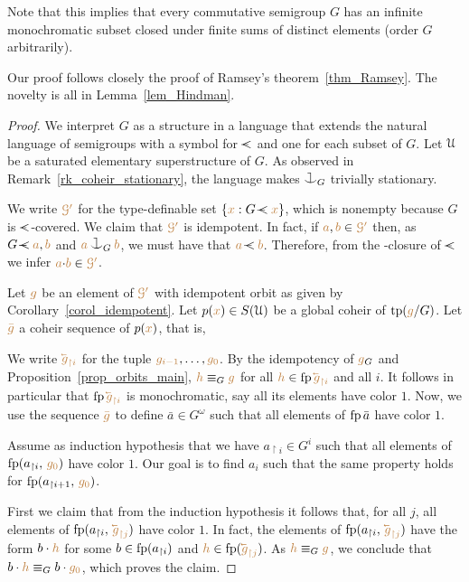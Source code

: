 Note that this implies that every commutative semigroup $G$ has an infinite monochromatic subset 
closed under finite sums of distinct elements (order $G$ arbitrarily).

Our proof follows closely the proof of Ramsey's theorem~\ref{thm_Ramsey}.
%
The novelty is all in Lemma~\ref{lem_Hindman}.

\begin{proof}
We interpret $G$ as a structure in a language 
that extends the natural language of semigroups
with a symbol for $\cpaw$ and one for each subset of $G$.
%
Let $\EuScript U$ be a saturated elementary superstructure of $G$.
%
As observed in Remark~\ref{rk_coheir_stationary}, 
the language makes $\cnonfork_G$ trivially stationary.

We write ${\color{brown}\EuScript G'}$ for the type-definable set $\{{\mr x} : G\cpaw{\mr x}\}$,
which is nonempty because $G$ is $\cpaw$-covered.
%
We claim that ${\color{brown}\EuScript G'}$ is idempotent.
%
In fact, if ${\color{brown} a},{\color{brown} b}\in{\color{brown}\EuScript G'}$ 
then, as $G\cpaw{\mr a},{\mr b}$ and ${\mr a}\cnonfork_G{\mr b}$, 
we must have that ${\mr a}\cpaw{\mr b}$.
%
Therefore, from the \cpawdot-closure of $\cpaw$ we infer ${\color{brown} a}{\cdot}{\color{brown} b}\in{\color{brown}\EuScript G'}$.

Let ${\color{brown} g}$ be an element of ${\color{brown}\EuScript G'}$ with idempotent orbit 
as given by Corollary~\ref{corol_idempotent}.
%
Let $p({\color{brown} x})\in S(\EuScript U)$ be a global coheir of ${\rm tp}({\color{brown} g}/G)$.
%
Let ${\color{brown}\bar g}$ a coheir sequence of $p({\color{brown} x})$, that is,


We write ${\mr \cev{g}_{\restriction i}}$ for the tuple ${\color{brown} g_{i-1}},\dots,{\color{brown} g_{0}}$.
%
By the idempotency of ${\color{brown} g}_G$ and Proposition~\ref{prop_orbits_main}, 
${\color{brown} h}\equiv_G{\color{brown} g}$ for all ${\mr h}\in \fp\,{\mr \cev{g}_{\restriction i}}$ and all $i$.
It follows in particular that $\fp\,{\mr \cev{g}_{\restriction i}}$ is monochromatic, 
say all its elements have color $1$.
%
Now, we use the sequence ${\color{brown}\bar g}$ to define $\bar a\in G^\omega$
such that all elements of ${\rm fp}\,\bar a$ have color $1$.

Assume as induction hypothesis that we have $a_{\restriction i}\in G^i$ 
such that all elements of ${\rm fp}(a_{\restriction i},\,{\color{brown} g_0})$ have color $1$.
%
Our goal is to find $a_i$ 
such that the same property holds for ${\rm fp}(a_{\restriction i+1},\,{\color{brown} g_0})$.

First we claim that from the induction hypothesis it follows that, 
for all $j$, all elements of $\fp(a_{\restriction i},\,{\mr\cev{g}_{\restriction j}})$ have color $1$.
%
In fact, the elements of $\fp(a_{\restriction i},\,{\mr\cev{g}_{\restriction j}})$ 
have the form $b\cdot{\color{brown}h}$ for some $b\in{\rm fp}(a_{\restriction i})$
and ${\mr h}\in\fp({\mr\cev{g}_{\restriction j}})$.
%
As ${\color{brown} h}\equiv_G{\color{brown} g}$, we conclude that $b\cdot{\color{brown}h}\equiv_Gb\cdot {\color{brown}g_0}$, which proves the claim.


\end{proof}

